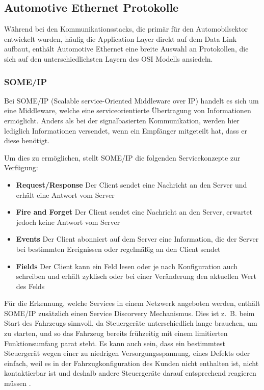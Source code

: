 \subsection{Automotive Ethernet Protokolle}\label{subsec:ethernetprotokolle}

Während bei den Kommunikationsstacks, die primär für den Automobilsektor entwickelt wurden, häufig die Application Layer direkt auf dem Data Link aufbaut, enthält Automotive Ethernet eine breite Auswahl an Protokollen, die sich auf den unterschiedlichsten Layern des OSI Modells ansiedeln.

\subsubsection{SOME/IP}\label{subsec:someip}

Bei SOME/IP (Scalable service-Oriented Middleware over IP) handelt es sich um eine Middleware, welche eine serviceorientierte Übertragung von Informationen ermöglicht. Anders als bei der signalbasierten Kommunikation, werden hier lediglich Informationen versendet, wenn ein Empfänger mitgeteilt hat, dass er diese benötigt.

Um dies zu ermöglichen, stellt SOME/IP die folgenden Servicekonzepte zur Verfügung:
\begin{itemize}
\item \textbf{Request/Response} Der Client sendet eine Nachricht an den Server und erhält eine Antwort vom Server
\item \textbf{Fire and Forget} Der Client sendet  eine Nachricht an den Server, erwartet jedoch keine Antwort vom Server
\item \textbf{Events} Der Client abonniert auf dem Server eine Information, die der Server bei bestimmten Ereignissen oder regelmäßig an den Client sendet
\item \textbf{Fields} Der Client kann ein Feld lesen oder je nach Konfiguration auch schreiben und erhält zyklisch oder bei einer Veränderung den aktuellen Wert des Felds
\end{itemize} 
\cite[S. 289]{automotiveethernet}

Für die Erkennung, welche Services in einem Netzwerk angeboten werden, enthält SOME/IP zusätzlich einen Service Discorvery Mechanismus. Dies ist z. B. beim Start des Fahrzeugs sinnvoll, da Steuergeräte unterschiedlich lange brauchen, um zu starten, und so das Fahrzeug bereits frühzeitig mit einem limitierten Funktionsumfang parat steht. Es kann auch sein, dass ein bestimmtest Steuergerät wegen einer zu niedrigen Versorgungsspannung, eines Defekts oder einfach, weil es in der Fahrzugkonfiguration des Kunden nicht enthalten ist, nicht kontaktierbar ist und deshalb andere Steuergeräte darauf entsprechend reagieren müssen \cite[S. 291]{automotiveethernet}.

